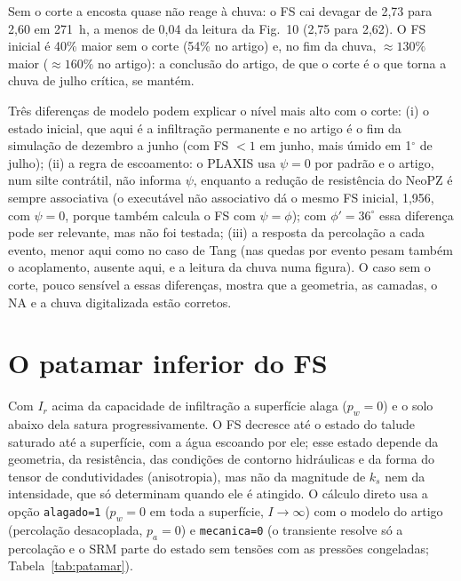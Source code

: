 Sem o corte a encosta quase n\~ao reage \`a chuva: o FS cai devagar de 2,73 para 2,60 em 271~h, a menos de 0,04 da
leitura da Fig.~10 (2,75 para 2,62). O FS inicial \'e 40\% maior sem o corte (54\% no artigo) e, no fim da chuva,
$\approx130\%$ maior ($\approx160\%$ no artigo): a conclus\~ao do artigo, de que o corte \'e o que torna a chuva de
julho cr\'itica, se mant\'em.

Tr\^es diferen\c{c}as de modelo podem explicar o n\'ivel mais alto com o corte: (i) o estado inicial, que aqui \'e a
infiltra\c{c}\~ao permanente e no artigo \'e o fim da simula\c{c}\~ao de dezembro a junho (com FS $<1$ em junho, mais
\'umido em 1$^\circ$ de julho); (ii) a regra de escoamento: o PLAXIS usa $\psi=0$ por padr\~ao e o artigo, num silte
contr\'atil, n\~ao informa $\psi$, enquanto a redu\c{c}\~ao de resist\^encia do NeoPZ \'e sempre associativa (o
execut\'avel n\~ao associativo d\'a o mesmo FS inicial, 1,956, com $\psi=0$, porque tamb\'em calcula o FS com
$\psi=\phi$); com $\phi'=36^\circ$ essa diferen\c{c}a pode ser relevante, mas n\~ao foi testada; (iii) a resposta da
percola\c{c}\~ao a cada evento, menor aqui como no caso de Tang (nas quedas por evento pesam tamb\'em o acoplamento,
ausente aqui, e a leitura da chuva numa figura). O caso sem o corte, pouco sens\'ivel a essas diferen\c{c}as, mostra
que a geometria, as camadas, o NA e a chuva digitalizada est\~ao corretos.

\section{O patamar inferior do FS}\label{sec:patamar}

Com $I_r$ acima da capacidade de infiltra\c{c}\~ao a superf\'icie alaga ($p_w=0$) e o solo abaixo dela satura
progressivamente. O FS decresce at\'e o estado do talude saturado at\'e a superf\'icie, com a \'agua escoando por ele;
esse estado depende da geometria, da resist\^encia, das condi\c{c}\~oes de contorno hidr\'aulicas e da forma do tensor de
condutividades (anisotropia), mas n\~ao da magnitude de $k_s$ nem da intensidade, que s\'o determinam quando ele \'e
atingido. O c\'alculo direto usa a op\c{c}\~ao \texttt{alagado=1} ($p_w=0$ em toda a superf\'icie, $I\to\infty$) com o
modelo do artigo (percola\c{c}\~ao desacoplada, $p_a=0$) e \texttt{mecanica=0} (o transiente resolve s\'o a
percola\c{c}\~ao e o SRM parte do estado sem tens\~oes com as press\~oes congeladas; Tabela~\ref{tab:patamar}).


